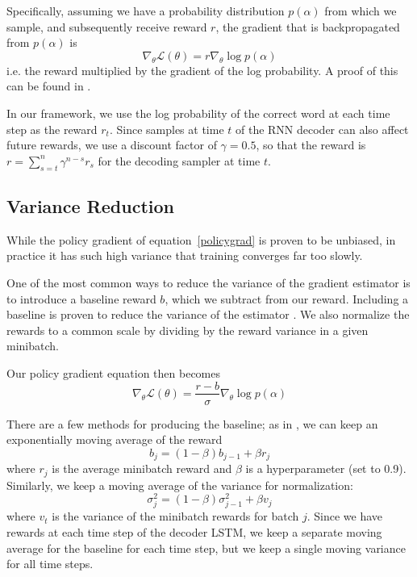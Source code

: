 \documentclass[11pt]{report}
\begin{document}
Specifically, assuming we have a probability distribution $p(\alpha)$ from which we sample, and subsequently receive reward $r$, the gradient that is backpropagated from $p(\alpha)$ is
\begin{equation}
\label{policygrad}
\nabla_\theta \mathcal{L}(\theta) = r \nabla_\theta \log p(\alpha)
\end{equation}
i.e. the reward multiplied by the gradient of the log probability. A proof of this can be found in \cite{williams1992reinforce}.

In our framework, we use the log probability of the correct word at each time step as the reward $r_t$. Since samples at time $t$ of the RNN decoder can also affect future rewards, we use a discount factor of $\gamma = 0.5$, so that the reward is $r = \sum_{s = t}^n \gamma^{n-s}r_s$ for the decoding sampler at time $t$.

\subsection{Variance Reduction}

While the policy gradient of equation~\ref{policygrad} is proven to be unbiased, in practice it has such high variance that training converges far too slowly.

One of the most common ways to reduce the variance of the gradient estimator is to introduce a baseline reward $b$, which we subtract from our reward. Including a baseline is proven to reduce the variance of the estimator \citep{mnih2014belief}. We also normalize the rewards to a common scale by dividing by the reward variance in a given minibatch.


Our policy gradient equation then becomes
\begin{equation}
\label{policygradbaseline}
\nabla_\theta \mathcal{L}(\theta) = \frac{r-b}{\sigma} \nabla_\theta \log p(\alpha)
\end{equation}

There are a few methods for producing the baseline; as in \cite{mnih2014belief}, we can keep an exponentially moving average of the reward
$$b_j = (1 - \beta) b_{j-1} + \beta r_j$$
where $r_j$ is the average minibatch reward and $\beta$ is a hyperparameter (set to 0.9).
Similarly, we keep a moving average of the variance for normalization:
$$\sigma^2_j = (1 - \beta) \sigma^2_{j-1} + \beta v_j$$
where $v_t$ is the variance of the minibatch rewards for batch $j$. Since we have rewards at each time step of the decoder LSTM, we keep a separate moving average for the baseline for each time step, but we keep a single moving variance for all time steps.
\end{document}
